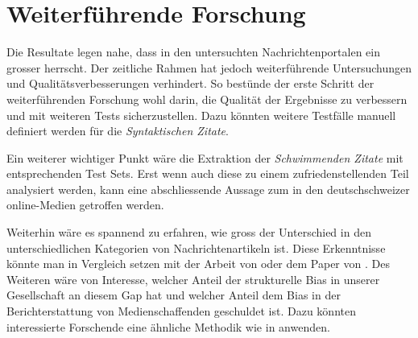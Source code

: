 \section{Weiterführende Forschung}\label{further-research}



Die Resultate legen nahe, dass in den untersuchten Nachrichtenportalen ein grosser
 herrscht. Der zeitliche Rahmen hat jedoch weiterführende Untersuchungen
und Qualitätsverbesserungen verhindert. So bestünde der erste Schritt der weiterführenden Forschung
wohl darin, die Qualität der Ergebnisse zu verbessern und mit weiteren Tests sicherzustellen.
Dazu könnten weitere Testfälle manuell definiert werden für die \textsl{Syntaktischen Zitate}.

Ein weiterer wichtiger Punkt wäre die Extraktion der \textsl{Schwimmenden Zitate} mit entsprechenden
Test Sets. Erst wenn auch diese zu einem zufriedenstellenden Teil analysiert werden, kann eine abschliessende
Aussage zum  in den deutschschweizer online-Medien getroffen werden.

Weiterhin wäre es spannend zu erfahren, wie gross der Unterschied in den unterschiedlichen Kategorien von Nachrichtenartikeln ist.
Diese Erkenntnisse könnte man in Vergleich setzen
mit der Arbeit  \cite{gender_bias_in_media} von \citeauthor{gender_bias_in_media} oder
dem Paper  von \citeauthor{does-gender-matter-in-the-news}.
Des Weiteren wäre von Interesse, welcher Anteil der strukturelle Bias in unserer Gesellschaft
an diesem Gap hat und welcher Anteil dem Bias in der Berichterstattung von Medienschaffenden
geschuldet ist. Dazu könnten interessierte Forschende eine ähnliche Methodik wie
\citeauthor{gender_bias_in_media} in  \cite{gender_bias_in_media}
anwenden.

